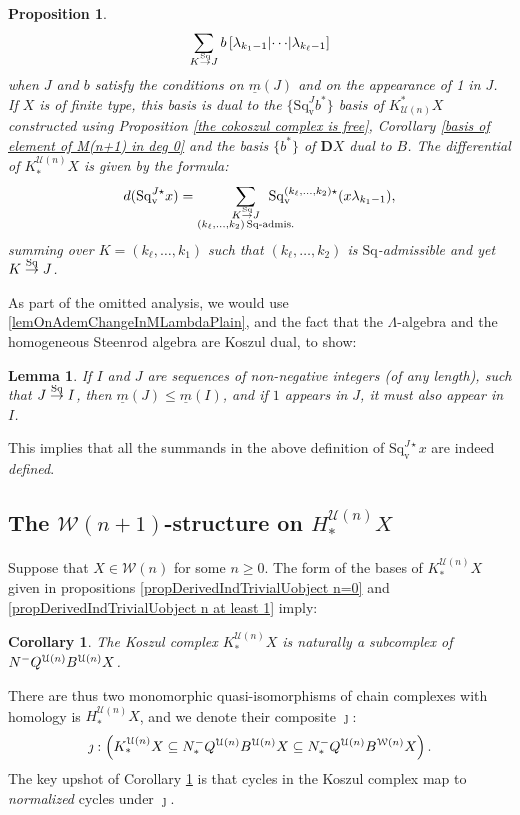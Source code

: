 \documentclass[11pt]{amsart} \renewcommand{\baselinestretch}{1.2}
\theoremstyle{plain}
\newtheorem{lem}[thm]{Lemma}
\newtheorem{prop}[thm]{Proposition}
\newtheorem{cor}[thm]{Corollary}
\numberwithin{equation}{section} %
\theoremstyle{plain}
\newtheorem{lem}[thm]{Lemma}
\newtheorem{prop}[thm]{Proposition}
\newtheorem{cor}[thm]{Corollary}
\numberwithin{equation}{chapter} %
\newcommand{\calU}{\mathcal{U}}
\newcommand{\calw}{\mathcal{W}}
\newcommand{\minDimSq}{\underline{m}}
\newcommand{\produces}[3]{#3:#1\sim #2}
\renewcommand{\produces}[3]{#1\rightarrow_{#3} #2}%
\renewcommand{\produces}[3]{#1\overset{\smash{#3}}{\rightarrow} #2}%
\newcommand{\Nop}{N^{\smash{-}}}
\newcommand{\Sq}{\mathrm{Sq}}
\newcommand{\dver}{_\mathrm{v}}
\newcommand{\Sqv}{\mathrm{Sq}\dver}
\newcommand{\Sqvstar}[1]{\mathrm{Sq}\dver^{#1\star}}
\newcommand{\dual}{\mathbf{D}}
\newcommand{\SubsectionOrSection}[1]{\subsection{#1}}
\begin{document}
\begin{Koszul complexes}
\begin{prop}
\[\sum_{\produces{K}{J}{\Sq}}b\left[\lambda_{k_1-1} \middle|\cdots\middle|\lambda_{k_\ell-1} \right]\]
when $J$ and $b$ satisfy the conditions on $\minDimSq(J)$ and on the appearance of 1 in $J$.
If $X$ is  of finite type, this basis is dual to the $\{\Sqv^Jb^*\}$ basis of $K^*_{\calU(n)}X$   constructed using Proposition \ref{the cokoszul complex is free}, Corollary \ref{basis of element of M(n+1) in deg 0} and the basis $\{b^*\}$  of $\dual X$ dual to $B$. The differential of $K^{\calU(n)}_*X$ is given by the formula:
\[d(\Sqvstar{J}x)=\sum_{ \substack{\produces{K}{J}{\Sq}\\(k_{\ell},\ldots,k_2){\,\Sq\textup{-admis.}}}}\!\!\!\!\!\!\!\!\!\!\!\! \Sqvstar{(k_{\ell},\ldots,k_2)}(x\lambda_{k_1-1}),\]
summing over $K=(k_{\ell},\ldots,k_1)$ such that $(k_{\ell},\ldots,k_2)$ is $\Sq$-admissible %
and yet $\produces{K}{J}{\Sq}$.
\end{prop}
\noindent As part of the omitted analysis, we would use \ref{lemOnAdemChangeInMLambdaPlain}, and the fact that the $\Lambda$-algebra and the homogeneous Steenrod algebra are Koszul dual, to show:
\begin{lem}
If $I$ and $J$ are sequences of non-negative integers (of any length), such that $\produces{J}{I}{\Sq}$, then $\minDimSq(J)\leq\minDimSq(I)$, and if $1$ appears in $J$, it must also appear in $I$.
\end{lem}
\noindent This implies that all the summands in the above definition of $\Sqvstar{J}x$ are indeed \emph{defined}.
\SubsectionOrSection{The $\calw(n+1)$-structure on $H_*^{\calU(n)}X$}\label{section on structure on homology of koszul cx}
Suppose that $X\in\calw(n)$ for some $n\geq0$. The form of the bases of $K_*^{\calU(n)}X$ given in propositions \ref{propDerivedIndTrivialUobject n=0} and \ref{propDerivedIndTrivialUobject n at least 1} imply:
\begin{cor}
\label{cycles in the Koszul complex are normalized cycles}
The Koszul complex $K_*^{\calU(n)}X$ is naturally a subcomplex of $\Nop Q^{\calU(n)}B^{\calU(n)}X$.
\end{cor}
\noindent  There are  thus two monomorphic quasi-isomorphisms of chain complexes with homology is $H_*^{\calU(n)}X$, and we denote their composite $\jmath$:
\[\jmath:\left(K_*^{\calU(n)}X\subseteq \Nop_*Q^{\calU(n)}B^{\calU(n)}X\subseteq \Nop_*Q^{\calU(n)}B^{\calw(n)}X\right).\]
The key upshot of Corollary \ref{cycles in the Koszul complex are normalized cycles} is that cycles in the Koszul complex map to \emph{normalized} cycles under $\jmath$.


\end{Koszul complexes}
\end{document}
